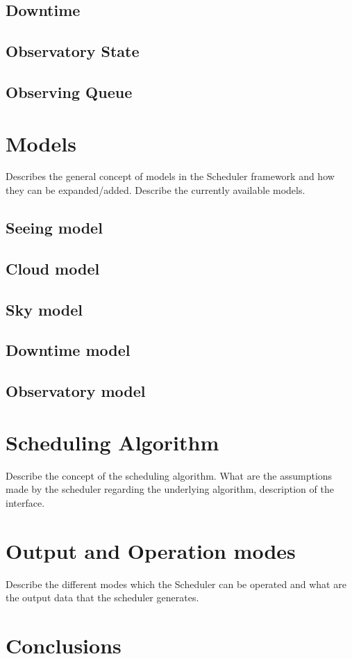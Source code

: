 \subsection{Downtime}

\subsection{Observatory State}

\subsection{Observing Queue}

\section{Models}

Describes the general concept of models in the Scheduler framework and how they can be expanded/added. Describe 
the currently available models. 

\subsection{Seeing model}

\subsection{Cloud model}

\subsection{Sky model}

\subsection{Downtime model}

\subsection{Observatory model}

\section{Scheduling Algorithm}

Describe the concept of the scheduling algorithm. What are the assumptions made by the scheduler regarding the underlying 
algorithm, description of the interface. 

\section{Output and Operation modes}

Describe the different modes which the Scheduler can be operated and what are the output data that the scheduler 
generates. 

\section{Conclusions}
